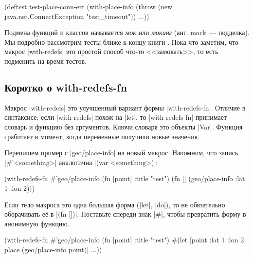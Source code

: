 
\begin{english}
  \begin{clojure}
(deftest test-place-conn-err
  (with-place-info
    (throw (new java.net.ConnectException "test_timeout"))
    ...))
  \end{clojure}
\end{english}


Подмена функций и классов называется \emph{мок} или \emph{мокинг} (анг. mock~---
подделка). Мы подробно рассмотрим тесты ближе к концу
книги . Пока что заметим, что макрос \spverb|with-redefs|
это простой способ что-то <<замокать>>, то есть подменить на время тестов.

\subsection{Коротко о with-redefs-fn}


Макрос \spverb|with-redefs| это улучшенный вариант формы
\spverb|with-redefs-fn|. Отличие в синтаксисе: если \spverb|with-redefs| похож
на \spverb|let|, то \spverb|with-redefs-fn| принимает словарь и функцию без
аргументов. Ключи словаря это объекты \spverb|Var|. Функция сработает в момент,
когда переменные получили новые значения.

Перепишем пример с \spverb|geo/place-info| на новый макрос. Напомним, что запись
\spverb|#'<something>| аналогична \spverb|(var <something>)|:

\begin{english}
  \begin{clojure}
(with-redefs-fn
  {#'geo/place-info (fn [point] {:title "test"})}
  (fn []
    (geo/place-info {:lat 1 :lon 2})))
  \end{clojure}
\end{english}


Если тело макроса это одна большая форма (\spverb|let|, \spverb|do|), то не
обязательно оборачивать е\"{е} в \spverb|(fn [])|. Поставьте спереди знак
\spverb|#|, чтобы превратить форму в анонимную функцию.

\begin{english}
  \begin{clojure}
(with-redefs-fn
  {#'geo/place-info (fn [point] {:title "test"})}
  #(let [point {:lat 1 :lon 2}
         place (geo/place-info point)]
     ...))
  \end{clojure}
\end{english}

